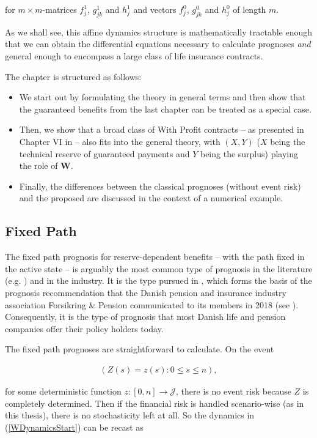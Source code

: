 \documentclass{article}
\newcommand{\1}[1]{\mathbbm{1}_{\left\lbrace #1 \right\rbrace}}
\theoremstyle{break}
\theoremstyle{remark}
\numberwithin{equation}{section}
\begin{document}
for $m \times m$-matrices $f_j^1$, $g_{jk}^1$ and $ h_j^1$ and vectors $f_j^0$, $g_{jk}^0$ and $ h_j^0$ of length $m$.

As we shall see, this affine dynamics structure is mathematically tractable enough that we can obtain the differential equations necessary to calculate prognoses \textit{and} general enough to encompass a large class of life insurance contracts.

The chapter is structured as follows:

\begin{itemize}
	\item We start out by formulating the theory in general terms and then show that the guaranteed benefits from the last chapter can be treated as a special case. 
	\item Then, we show that a broad class of With Profit contracts -- as presented in Chapter VI in \cite{Liv2Bog} -- also fits into the general theory, with $(X,Y)$ ($X$ being the technical reserve of guaranteed payments and $Y$ being the surplus) playing the role of $\textbf{W}$.
	\item Finally, the differences between the classical prognoses (without event risk) and the proposed are discussed in the context of a numerical example.
\end{itemize}



\subsection{Fixed Path}

The fixed path prognosis for reserve-dependent benefits -- with the path fixed in the active state -- is arguably the most common type of prognosis in the literature (e.g. \cite{NinnaReitzel}) and in the industry. It is the type pursued in \cite{Munk}, which forms the basis of the prognosis recommendation that the Danish pension and insurance industry association Forsikring \& Pension communicated to its members in 2018 (see \cite{Henstilling}). Consequently, it is the type of prognosis that most Danish life and pension companies offer their policy holders today.

The fixed path prognoses are straightforward to calculate. On the event

\begin{align*}
	\left( Z(s) = z(s) : 0 \leq s \leq n \right),
\end{align*}

for some deterministic function $z: [0,n] \to \mathcal{J}$, there is no event risk because $Z$ is completely determined. Then if the financial risk is handled scenario-wise (as in this thesis), there is no stochasticity left at all. So the dynamics in (\ref{WDynamicsStart}) can be recast as
\end{document}
